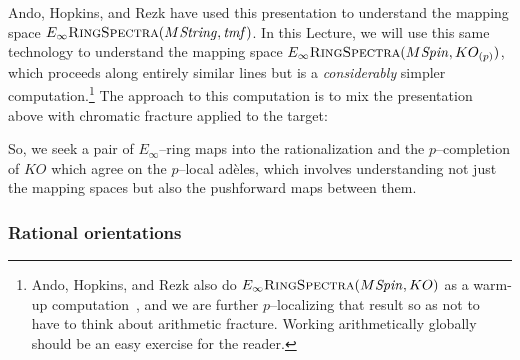 Ando, Hopkins, and Rezk have used this presentation to understand the mapping space $E_\infty\normalfont\textsc{RingSpectra}(M\mathit{String}, \mathit{tmf})$.  In this Lecture, we will use this same technology to understand the mapping space $E_\infty\normalfont\textsc{RingSpectra}(M\mathit{Spin}, KO_{(p)})$, which proceeds along entirely similar lines but is a \emph{considerably} simpler computation.\footnote{Ando, Hopkins, and Rezk also do $E_\infty\normalfont\textsc{RingSpectra}(M\mathit{Spin}, KO)$ as a warm-up computation~\cite[Section 7]{AHR}, and we are further $p$--localizing that result so as not to have to think about arithmetic fracture.  Working arithmetically globally should be an easy exercise for the reader.}  The approach to this computation is to mix the presentation above with chromatic fracture applied to the target:
\begin{center}
\end{center}
So, we seek a pair of $E_\infty$--ring maps into the rationalization and the $p$--completion of $KO$ which agree on the $p$--local ad\`eles, which involves understanding not just the mapping spaces but also the pushforward maps between them.





\subsubsection{Rational orientations}

